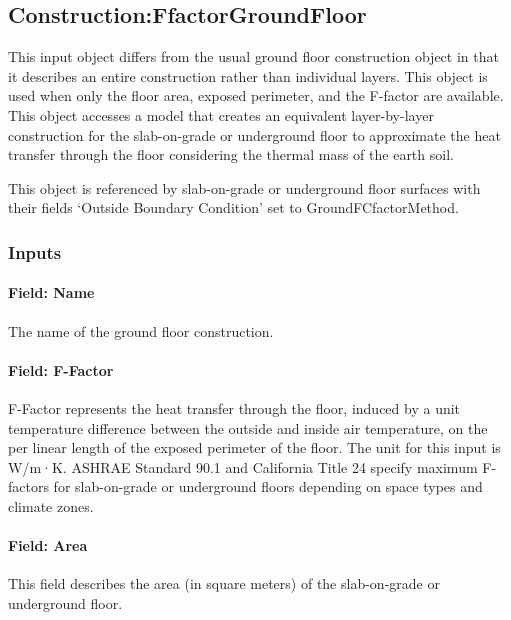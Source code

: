 \subsection{Construction:FfactorGroundFloor}\label{constructionffactorgroundfloor}

This input object differs from the usual ground floor construction object in that it describes an entire construction rather than individual layers. This object is used when only the floor area, exposed perimeter, and the F-factor are available.~ This object accesses a model that creates an equivalent layer-by-layer construction for the slab-on-grade or underground floor to approximate the heat transfer through the floor considering the thermal mass of the earth soil.

This object is referenced by slab-on-grade or underground floor surfaces with their fields `Outside Boundary Condition' set to GroundFCfactorMethod.

\subsubsection{Inputs}\label{inputs-37}

\paragraph{Field: Name}\label{field-name-30-000}

The name of the ground floor construction.

\paragraph{Field: F-Factor}\label{field-f-factor}

F-Factor represents the heat transfer through the floor, induced by a unit temperature difference between the outside and inside air temperature, on the per linear length of the exposed perimeter of the floor. The unit for this input is W/m·K. ASHRAE Standard 90.1 and California Title 24 specify maximum F-factors for slab-on-grade or underground floors depending on space types and climate zones.

\paragraph{Field: Area}\label{field-area}

This field describes the area (in square meters) of the slab-on-grade or underground floor.

